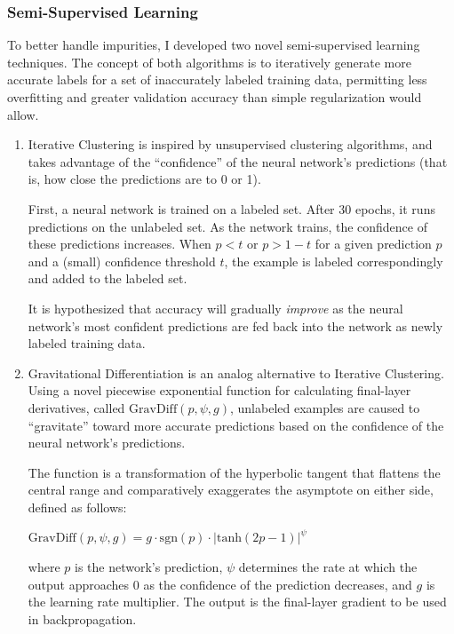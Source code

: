 \documentclass[12pt]{article}
\begin{document}
\subsubsection{Semi-Supervised Learning}

To better handle impurities, I developed two novel semi-supervised learning techniques. The concept of both algorithms is to iteratively generate more accurate labels for a set of inaccurately labeled training data, permitting less overfitting and greater validation accuracy than simple regularization would allow.

\begin{enumerate}
    \item Iterative Clustering is inspired by unsupervised clustering algorithms, and takes advantage of the ``confidence'' of the neural network's predictions (that is, how close the predictions are to 0 or 1).
    
    First, a neural network is trained on a labeled set. After 30 epochs, it runs predictions on the unlabeled set. As the network trains, the confidence of these predictions increases. When $p < t$ or $p > 1 - t$ for a given prediction $p$ and a (small) confidence threshold $t$, the example is labeled correspondingly and added to the labeled set.

    It is hypothesized that accuracy will gradually \textit{improve} as the neural network's most confident predictions are fed back into the network as newly labeled training data.

    \item Gravitational Differentiation is an analog alternative to Iterative Clustering. Using a novel piecewise exponential function for calculating final-layer derivatives, called $\mathrm{GravDiff}(p, \psi, g)$, unlabeled examples are caused to ``gravitate'' toward more accurate predictions based on the confidence of the neural network's predictions.

    The function is a transformation of the hyperbolic tangent that flattens the central range and comparatively exaggerates the asymptote on either side, defined as follows:
    \begin{center}
        $\mathrm{GravDiff}(p, \psi, g) = g \cdot \mathrm{sgn}(p) \cdot \lvert \mathrm{tanh}(2p - 1) \rvert ^ \psi$
    \end{center}
    where $p$ is the network's prediction, $\psi$ determines the rate at which the output approaches 0 as the confidence of the prediction decreases, and $g$ is the learning rate multiplier. The output is the final-layer gradient to be used in backpropagation.
\end{enumerate}
\end{document}
